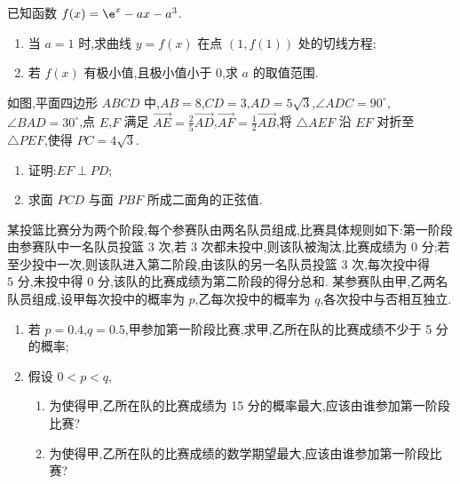 \begin{problem}
已知函数 \(f(x)=\e^x-ax-a^3\).
\begin{enumerate}
\item 当 \(a=1\) 时,求曲线 \(y=f(x)\) 在点 \((1,f(1))\) 处的切线方程;
\item 若 \(f(x)\) 有极小值,且极小值小于 0,求 \(a\) 的取值范围.
\end{enumerate}
\end{problem}

\begin{problem}
如图,平面四边形 \(ABCD\) 中,\(AB=8\),\(CD=3\),\(AD=5\sqrt3\),\(\angle ADC=90^\circ\),\(\angle BAD=30^\circ\),点 \(E\),\(F\) 满足 \(\overrightarrow{AE}=\frac{2}{5}\overrightarrow{AD}\),\(\overrightarrow{AF}=\frac{1}{2}\overrightarrow{AB}\),将 \(\triangle AEF\) 沿 \(EF\) 对折至 \(\triangle PEF\),使得 \(PC=4\sqrt3\).
\begin{enumerate}
\item 证明:\(EF\perp PD\);
\item 求面 \(PCD\) 与面 \(PBF\) 所成二面角的正弦值.
\end{enumerate}

\end{problem}

\begin{problem}
某投篮比赛分为两个阶段,每个参赛队由两名队员组成,比赛具体规则如下:第一阶段由参赛队中一名队员投篮 \(3\text{ 次}\),若 \(3\text{ 次}\)都未投中,则该队被淘汰,比赛成绩为 \(0\text{ 分}\);若至少投中一次,则该队进入第二阶段,由该队的另一名队员投篮 \(3\text{ 次}\),每次投中得 \(5\text{ 分}\),未投中得 \(0\text{ 分}\),该队的比赛成绩为第二阶段的得分总和. 某参赛队由甲,乙两名队员组成,设甲每次投中的概率为 \(p\),乙每次投中的概率为 \(q\),各次投中与否相互独立.
\begin{enumerate}
\item 若 \(p=0.4\),\(q=0.5\),甲参加第一阶段比赛,求甲,乙所在队的比赛成绩不少于 5 分的概率;
\item 假设 \(0<p<q\),
\begin{enumerate}
\item 为使得甲,乙所在队的比赛成绩为 15 分的概率最大,应该由谁参加第一阶段比赛?
\item 为使得甲,乙所在队的比赛成绩的数学期望最大,应该由谁参加第一阶段比赛?
\end{enumerate}
\end{enumerate}
\end{problem}

